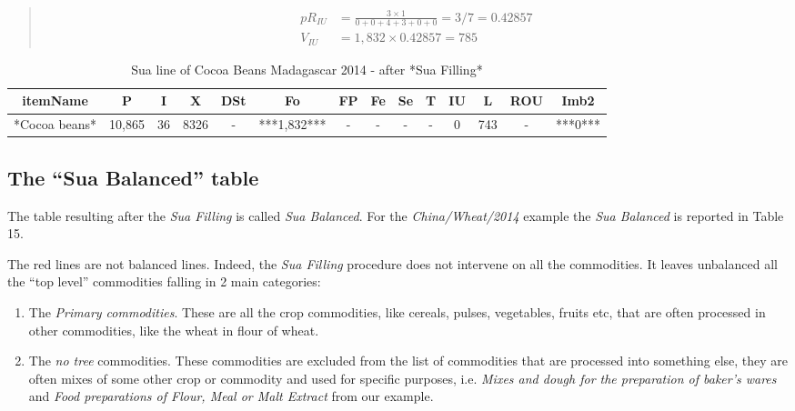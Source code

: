 \documentclass[]{article}
\providecommand{\tightlist}{%
  \setlength{\itemsep}{0pt}\setlength{\parskip}{0pt}}
\begin{document}
\begin{quote}
\end{quote}

\begin{quote}
\begin{equation}
\begin{aligned}
\label{eq:VIUC}
pR_{IU} &= \frac{3\times 1}{0 + 0 + 4 + 3 + 0 + 0} = 3/7 = 0.42857\\
V_{IU} &= 1,832 \times 0.42857 = 785
\end{aligned}
\end{equation}
\end{quote}

\begin{table}

\caption{\label{tab:t13}Sua line of Cocoa Beans Madagascar 2014 - after *Sua Filling*}
\centering
\begin{tabular}[t]{c|c|c|c|c|c|c|c|c|c|c|c|c|c}
\hline
itemName & P & I & X & DSt & Fo & FP & Fe & Se & T & IU & L & ROU & Imb2\\
\hline
*Cocoa beans* & 10,865 & 36 & 8326 & - & ***1,832*** & - & - & - & - & 0 & 743 & - & ***0***\\
\hline
\end{tabular}
\end{table}

\subsection*{\texorpdfstring{The ``Sua Balanced''
table}{The Sua Balanced table}}\label{the-sua-balanced-table}

The table resulting after the \emph{Sua Filling} is called \emph{Sua
Balanced}. For the \emph{China/Wheat/2014} example the \emph{Sua
Balanced} is reported in Table 15.

The red lines are not balanced lines. Indeed, the \emph{Sua Filling}
procedure does not intervene on all the commodities. It leaves
unbalanced all the ``top level'' commodities falling in 2 main
categories:

\begin{enumerate}
\def\labelenumi{\arabic{enumi}.}
\tightlist
\item
  The \emph{Primary commodities}. These are all the crop commodities,
  like cereals, pulses, vegetables, fruits etc, that are often processed
  in other commodities, like the wheat in flour of wheat.
\item
  The \emph{no tree} commodities. These commodities are excluded from
  the list of commodities that are processed into something else, they
  are often mixes of some other crop or commodity and used for specific
  purposes, i.e. \emph{Mixes and dough for the preparation of baker's
  wares} and \emph{Food preparations of Flour, Meal or Malt Extract}
  from our example.
\end{enumerate}
\end{document}
